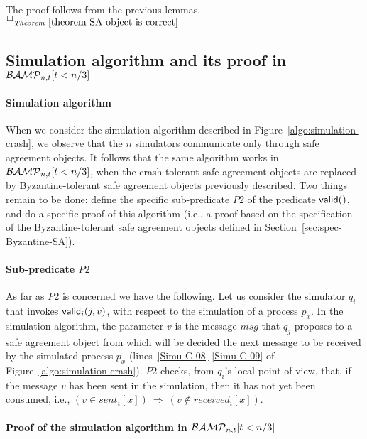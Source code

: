 \documentclass[11pt,letterpaper]{article}
\newlength {\afterproof}
\newcommand{\toto}{xxx}
\newenvironment{proofT}{\noindent{\bf Proof }}
{\hspace*{\fill}$\Box_{\mathit{Theorem}~\ref{\toto}}$\par\vspace{\afterproof}}
\newcommand{\BM}{{\cal BAMP}_{n,t}}
\begin{document}
\begin{proofT}
The proof follows from the previous lemmas. 
\renewcommand{\toto}{theorem-SA-object-is-correct}
\end{proofT}

\subsection{Simulation algorithm and its proof in  $\BM[t<n/3]$}
\label{sec:simulation-byzantine}
\paragraph{Simulation algorithm}
When we consider the simulation algorithm described in
Figure~\ref{algo:simulation-crash}, we observe that the $n$ simulators
communicate  only through  safe agreement objects.  It follows  that
the same algorithm works in $\BM[t<n/3]$, when the crash-tolerant
safe agreement objects are replaced by Byzantine-tolerant
safe agreement objects previously described.
Two  things remain to be done: define the specific sub-predicate
$P2$ of the predicate ${\sf valid}()$, and
do a specific proof of this algorithm
(i.e., a proof based on the specification of the  Byzantine-tolerant
safe agreement objects defined in Section~\ref{sec:spec-Byzantine-SA}).



\paragraph{Sub-predicate $P2$}
As far as $P2$ is concerned we have the following.
Let us consider the simulator $q_i$ that invokes  ${\sf valid}_i(j,v)$,
with respect to the simulation of a process $p_x$.
In the simulation algorithm, the parameter $v$ is the message $msg$
that $q_j$ proposes to a safe agreement object from which will be decided
the next message to be received  by the simulated process $p_x$
(lines~\ref{Simu-C-08}-\ref{Simu-C-09} of Figure~\ref{algo:simulation-crash}).
$P2$ checks, from $q_i$'s local point of view,  that, if the message $v$
has been sent in the simulation, then it has not yet been consumed,
i.e., $(v\in sent_i[x])~\Rightarrow~(v \notin received_i[x])$.



\paragraph{Proof of the simulation algorithm in $\BM[t<n/3]$}
\end{document}
